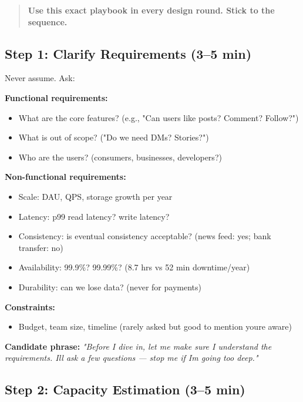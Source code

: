 \documentclass[11pt]{article}
\providecommand{\tightlist}{\setlength{\itemsep}{1pt}\setlength{\parskip}{0pt}}
\begin{document}
\begin{quote}
\textbf{Use this exact playbook in every design round. Stick to the sequence.}
\end{quote}

\subsection{Step 1: Clarify Requirements (3--5 min)}\label{step-1-clarify-requirements-35-min}

Never assume. Ask:

\textbf{Functional requirements:}

\begin{itemize}
\tightlist
\item
  What are the core features? (e.g., "Can users like posts? Comment? Follow?")
\item
  What is out of scope? ("Do we need DMs? Stories?")
\item
  Who are the users? (consumers, businesses, developers?)
\end{itemize}

\textbf{Non-functional requirements:}

\begin{itemize}
\tightlist
\item
  Scale: DAU, QPS, storage growth per year
\item
  Latency: p99 read latency? write latency?
\item
  Consistency: is eventual consistency acceptable? (news feed: yes; bank transfer: no)
\item
  Availability: 99.9\%? 99.99\%? (8.7 hrs vs 52 min downtime/year)
\item
  Durability: can we lose data? (never for payments)
\end{itemize}

\textbf{Constraints:}

\begin{itemize}
\tightlist
\item
  Budget, team size, timeline (rarely asked but good to mention you\textquotesingle re aware)
\end{itemize}

\textbf{Candidate phrase:} \emph{"Before I dive in, let me make sure I understand the requirements. I\textquotesingle ll ask a few questions --- stop me if I\textquotesingle m going too deep."}

\subsection{Step 2: Capacity Estimation (3--5 min)}\label{step-2-capacity-estimation-35-min}
\end{document}
